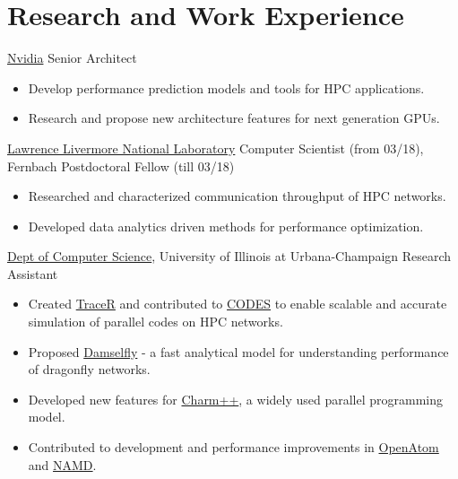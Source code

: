 \section{Research and Work Experience}
		{\href{https://www.nvidia.com/en-us/}{Nvidia}}
		{Senior Architect}
		{}{}
		{
		\begin{itemize}
		\item Develop performance prediction models and tools for HPC applications.
    \item Research and propose new architecture features for next generation
    GPUs.
		\end{itemize}
	  }
		{\href{http://www.llnl.gov}{Lawrence Livermore National Laboratory}}
		{Computer Scientist (from 03/18), Fernbach Postdoctoral Fellow (till 03/18)}
		{}{}
		{
		\begin{itemize}
		\item Researched and characterized communication throughput of HPC networks.
    \item Developed data analytics driven methods for performance optimization.
		\end{itemize}
	  }
		{\href{https://cs.illinois.edu}{Dept of Computer Science}, University of Illinois at Urbana-Champaign}
		{Research Assistant}
		{}{}
		{
		\begin{itemize}
    \item Created \href{https://github.com/LLNL/tracer}{TraceR} and contributed
    to \href{https://xgitlab.cels.anl.gov/codes/codes}{CODES} to enable scalable and accurate simulation of parallel codes on HPC networks.
    \item Proposed \href{https://github.com/LLNL/damselfly}{Damselfly} - a fast
    analytical model for understanding performance of dragonfly networks.
    \item Developed new features for
    \href{https://charm.cs.illinois.edu}{Charm++}, a widely used parallel programming model.
    \item Contributed to development and performance improvements in
    \href{http://charm.cs.illinois.edu/OpenAtom/}{OpenAtom} and \href{http://www.ks.uiuc.edu/Research/namd}{NAMD}.
		\end{itemize}
    }

